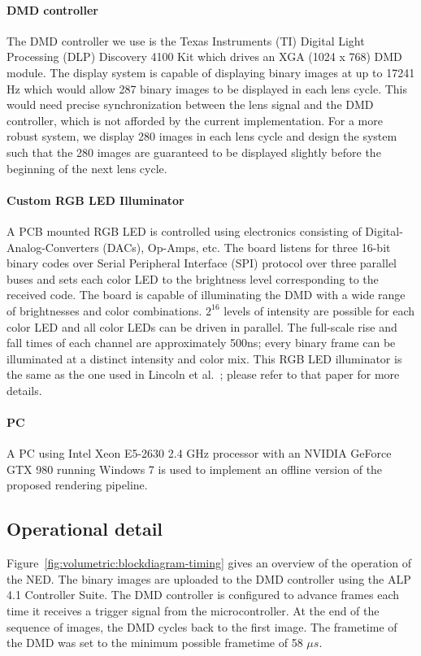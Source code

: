 \paragraph{DMD controller} 
The DMD controller we use is the Texas Instruments (TI) Digital Light Processing (DLP) Discovery 4100 Kit which drives an XGA (1024 x 768) DMD module. The display system is capable of displaying binary images at up to 17241 Hz which would allow 287 binary images to be displayed in each lens cycle. This would need precise synchronization between the lens signal and the DMD controller, which is not afforded by the current implementation. For a more robust system, we display 280 images in each lens cycle and design the system such that the 280 images are guaranteed to be displayed slightly before the beginning of the next lens cycle. 

\paragraph{Custom RGB LED Illuminator}
A PCB mounted RGB LED is controlled using electronics consisting of Digital-Analog-Converters (DACs), Op-Amps, etc. The board listens for three 16-bit binary codes over Serial Peripheral Interface (SPI) protocol over three parallel buses and sets each color LED to the brightness level corresponding to the received code. The board is capable of illuminating the DMD with a wide range of brightnesses and color combinations. $2^{16}$ levels of intensity are possible for each color LED and all color LEDs can be driven in parallel. The full-scale rise and fall times of each channel are approximately 500ns; every binary frame can be illuminated at a distinct intensity and color mix. This RGB LED illuminator is the same as the one used in Lincoln et al.~\cite{Lincoln2017scene}; please refer to that paper for more details. 

\paragraph{PC}
A PC using Intel Xeon E5-2630 2.4 GHz processor with an NVIDIA GeForce GTX 980 running Windows 7 is used to implement an offline version of the proposed rendering pipeline. 



\subsection{Operational detail}
Figure~\ref{fig:volumetric:blockdiagram-timing} gives an overview of the operation of the NED. The binary images are uploaded to the DMD controller using the ALP 4.1 Controller Suite. The DMD controller is configured to advance frames each time it receives a trigger signal from the microcontroller. At the end of the sequence of images, the DMD cycles back to the first image. The frametime of the DMD was set to the minimum possible frametime of 58 $\mu s$.

